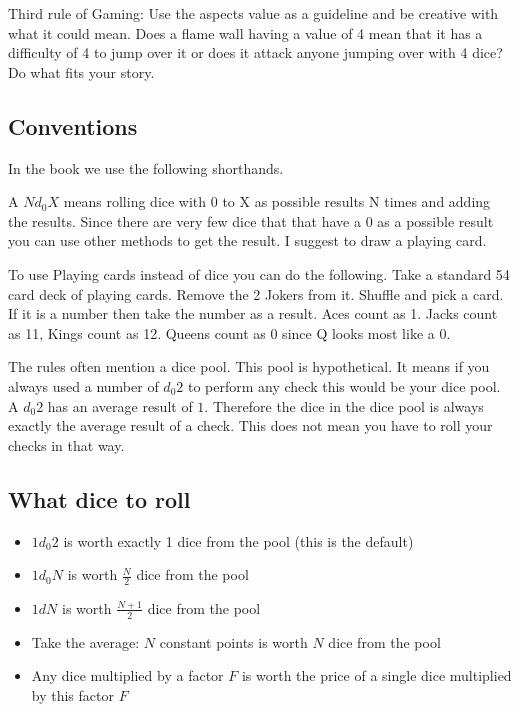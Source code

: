 \documentclass[11pt]{article}
\begin{document}
{Third rule of Gaming: Use the aspects value as a guideline and be creative with what it could mean. Does a flame wall having a value of 4 mean that it has a difficulty of 4 to jump over it or does it attack anyone jumping over with 4 dice? Do what fits your story. 


\subsection{Conventions}
\label{sec:org4ab0713}

In the book we use the following shorthands.

A \(N d_0 X\) means rolling dice with 0 to X as possible results N times and adding the results. Since there are very few dice that that have a 0 as a possible result you can use other methods to get the result. I suggest to draw a playing card.

To use Playing cards instead of dice you can do the following. Take a standard 54 card deck of playing cards. Remove the 2 Jokers from it. Shuffle and pick a card. If it is a number then take the number as a result. Aces count as 1. Jacks count as 11, Kings count as 12. Queens count as 0 since Q looks most like a 0.

The rules often mention a dice pool. This pool is hypothetical. It means if you always used a number of  \(d_0 2\) to perform any check this would be your dice pool. A \(d_0 2\) has an average result of \(1\). Therefore the dice in the dice pool is always exactly the average result of a check. This does not mean you have to roll your checks in that way.


\subsection{What dice to roll}
\label{sec:org6f8610d}
\begin{itemize}
\item \(1 d_0 2\) is worth exactly 1 dice from the pool (this is the default)
\item \(1 d_0 N\) is worth \(\frac{N}{2}\) dice from the pool
\item \(1 d N\) is worth \(\frac{N+1}{2}\) dice from the pool
\item Take the average: \(N\) constant points is worth \(N\) dice from the pool
\item Any dice multiplied by a factor \(F\) is worth the price of a single dice multiplied by this factor \(F\)
\end{itemize}

}
\end{document}
